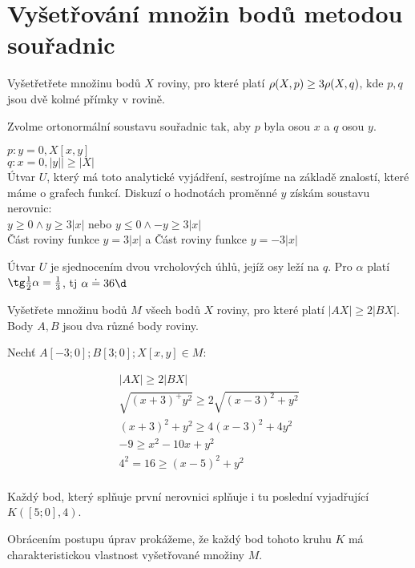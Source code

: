 
\BeginDoc{}
\section{Vyšetřování množin bodů metodou souřadnic}
\Pr
Vyšetřetřete množinu bodů $X$ roviny, pro které platí $\rho(X,p) \ge 3 \* \rho(X,q)$, kde $p,q$ jsou dvě kolmé přímky  v  rovině.

Zvolme ortonormální soustavu souřadnic tak, aby $p$ byla osou $x$ a $q$ osou $y$.

$p: y = 0, X[x,y]$\\
$q: x = 0, |y|| \ge|X|$\\

Útvar $U$, který má toto analytické vyjádření, sestrojíme na základě znalostí, které máme o grafech funkcí.
Diskuzí o hodnotách proměnné $y$ získám soustavu nerovnic:\\
$y\ge 0 \land y \ge 3 |x|$ nebo $y\le 0 \land -y\ge 3 |x|$\\
Část roviny  funkce $y=3|x|$ a 
Část roviny  funkce $y=-3|x|$ 

Útvar $U$ je sjednocením dvou vrcholových úhlů, jejíž osy leží na $q$.
Pro $\alpha$ platí $\tg \f 1 2 \alpha = \f 1 3$, tj $\alpha \doteq 36\d$

\Pr Vyšetřete množinu bodů $M$ všech bodů $X$ roviny, pro které platí $|AX| \ge 2 |BX|$.
Body $A,B$ jsou dva různé body roviny.

Nechť $A[-3;0];B[3;0];X[x,y]\in M$:

\begin{eqnarray*}
	|AX| \ge 2 |BX| \\
	\sqrt{(x+3)^ + y^2} \ge 2 \sqrt{(x-3)^2+y^2} \\
	(x+3)^2 + y^2 \ge 4 (x-3)^2+4y^2 \\
	-9 \ge x^2 - 10 x + y^2 \\
	4^2 = 16 \ge (x-5)^2 + y^2 \\
\end{eqnarray*}

Každý bod, který splňuje první nerovnici splňuje i tu poslední vyjadřující $K([5;0],4)$.

Obrácením postupu úprav prokážeme, že každý bod tohoto kruhu $K$ má charakteristickou vlastnost vyšetřované množiny $M$.

